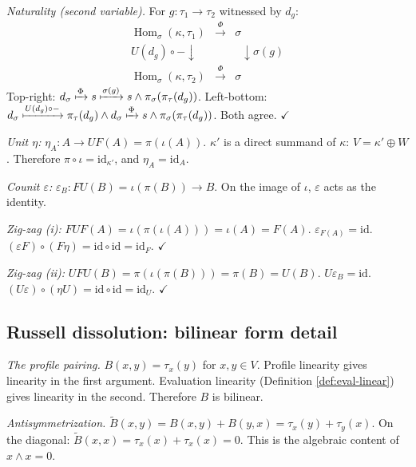 \emph{Naturality (second variable).}
For $g: \tau_1 \to \tau_2$ witnessed by $d_g$:
\[
\begin{array}{ccc}
  \operatorname{Hom}_\sigma(\kappa, \tau_1)
  & \xrightarrow{\;\Phi\;} & \sigma \\[6pt]
  {\scriptstyle{U(d_g) \circ -}}\downarrow\phantom{x} & &
  \phantom{x}\downarrow{\scriptstyle{\sigma(g)}} \\[6pt]
  \operatorname{Hom}_\sigma(\kappa, \tau_2)
  & \xrightarrow{\;\Phi\;} & \sigma
\end{array}
\]
Top-right: $d_\sigma \xmapsto{\Phi} s
\xmapsto{\sigma(g)} s \wedge \pi_\sigma(\pi_\tau(d_g))$.
Left-bottom: $d_\sigma \xmapsto{U(d_g) \circ -}
\pi_\tau(d_g) \wedge d_\sigma \xmapsto{\Phi}
s \wedge \pi_\sigma(\pi_\tau(d_g))$.
Both agree. $\checkmark$

\emph{Unit $\eta$:}
$\eta_A: A \to UF(A) = \pi(\iota(A))$.
$\kappa'$ is a direct summand of $\kappa$:
$V = \kappa' \oplus W$. Therefore
$\pi \circ \iota = \mathrm{id}_{\kappa'}$, and
$\eta_A = \mathrm{id}_A$.

\emph{Counit $\varepsilon$:}
$\varepsilon_B: FU(B) = \iota(\pi(B)) \to B$.
On the image of $\iota$, $\varepsilon$ acts as
the identity.

\emph{Zig-zag (i):}
$FUF(A) = \iota(\pi(\iota(A))) = \iota(A) = F(A)$.
$\varepsilon_{F(A)} = \mathrm{id}$.
$(\varepsilon F) \circ (F \eta) = \mathrm{id} \circ
\mathrm{id} = \mathrm{id}_F$. $\checkmark$

\emph{Zig-zag (ii):}
$UFU(B) = \pi(\iota(\pi(B))) = \pi(B) = U(B)$.
$U\varepsilon_B = \mathrm{id}$.
$(U\varepsilon) \circ (\eta U) = \mathrm{id} \circ
\mathrm{id} = \mathrm{id}_U$. $\checkmark$

\subsection{Russell dissolution: bilinear form detail}
\label{app:russell-detail}

\emph{The profile pairing.}
$B(x, y) = \tau_x(y)$ for $x, y \in V$. Profile
linearity gives linearity in the first argument.
Evaluation linearity (Definition \ref{def:eval-linear})
gives linearity in the second. Therefore $B$ is bilinear.

\emph{Antisymmetrization.}
$\widetilde{B}(x, y) = B(x,y) + B(y,x) = \tau_x(y) +
\tau_y(x)$. On the diagonal:
$\widetilde{B}(x, x) = \tau_x(x) + \tau_x(x) = 0$.
This is the algebraic content of $x \wedge x = 0$.

